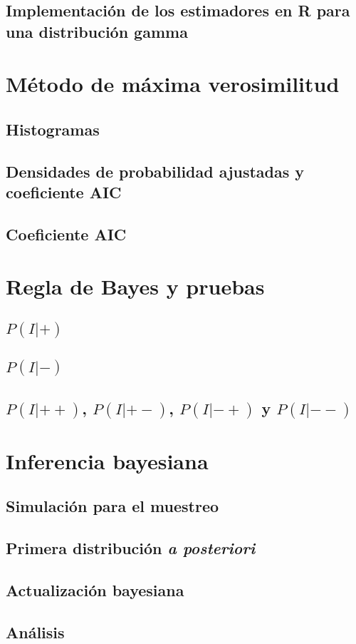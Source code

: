 \documentclass[10pt,letterpaper]{article}
\begin{document}
\subsection{Implementación de los estimadores en R para una distribución gamma}

\section{Método de máxima verosimilitud}
\subsection{Histogramas}
\subsection{Densidades de probabilidad ajustadas y coeficiente AIC}
\subsection{Coeficiente AIC}

\section{Regla de Bayes y pruebas}
\subsection{$P(I|+)$}
\subsection{$P(I|-)$}
\subsection{$P(I|++)$, $P(I|+-)$, $P(I|-+)$ y $P(I|--)$}

\section{Inferencia bayesiana}
\subsection{Simulación para el muestreo}
\subsection{Primera distribución {\em a posteriori}}
\subsection{Actualización bayesiana}
\subsection{Análisis}
\end{document}
